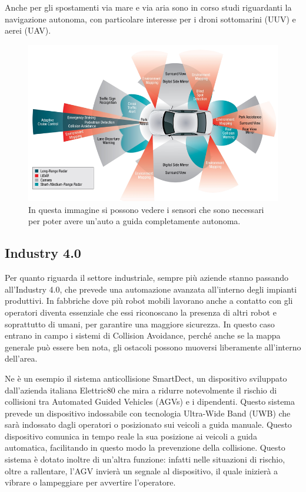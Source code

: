 \documentclass[Lau, binding=0.6cm, oneside]{sapthesis}
\begin{document}
Anche per gli spostamenti via mare e via aria sono in corso studi riguardanti la navigazione autonoma, con particolare interesse per i droni sottomarini (UUV) e aerei (UAV).

\begin{figure}[H]
    \centering
    \includegraphics[width=12.5cm]{driverless_car.png}
    \caption{In questa immagine si possono vedere i sensori che sono necessari per poter avere un'auto a guida completamente autonoma.}
    \label{fig:driverless_car}
\end{figure}

\subsection{Industry 4.0}
Per quanto riguarda il settore industriale, sempre più aziende stanno passando all'Industry 4.0, che prevede una automazione avanzata all'interno degli impianti produttivi.
In fabbriche dove più robot mobili lavorano anche a contatto con gli operatori diventa essenziale che essi riconoscano la presenza di altri robot e soprattutto di umani, per garantire una maggiore sicurezza.
In questo caso entrano in campo i sistemi di Collision Avoidance, perché anche se la mappa generale può essere ben nota, gli ostacoli possono muoversi liberamente all'interno dell'area.

Ne è un esempio il sistema anticollisione SmartDect, un dispositivo sviluppato dall'azienda italiana Elettric80 che mira a ridurre notevolmente il rischio di collisioni tra Automated Guided Vehicles (AGVs) e i dipendenti\cite{fonte9}.
Questo sistema prevede un dispositivo indossabile con tecnologia Ultra-Wide Band (UWB) che sarà indossato dagli operatori o posizionato sui veicoli a guida manuale.
Questo dispositivo comunica in tempo reale la sua posizione ai veicoli a guida automatica, facilitando in questo modo la prevenzione della collisione.
Questo sistema è dotato inoltre di un'altra funzione: infatti nelle situazioni di rischio, oltre a rallentare, l'AGV invierà un segnale al dispositivo, il quale inizierà a vibrare o lampeggiare per avvertire l'operatore\cite{fonte10}.
\end{document}
